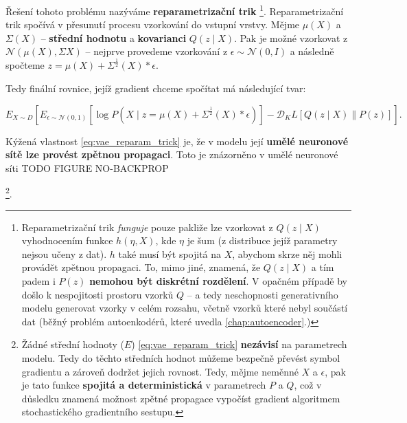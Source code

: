 Řešení tohoto problému nazýváme \textbf{reparametrizační trik}
\footnote{Reparametrizační trik \emph{funguje} pouze pakliže lze vzorkovat z $Q(z\mid X)$ vyhodnocením funkce $h(\eta, X)$, kde $\eta$ je šum (z distribuce jejíž parametry nejsou učeny z dat). $h$ také musí být spojitá na $X$, abychom skrze něj mohli provádět zpětnou propagaci.
To, mimo jiné, znamená, že $Q(z\mid X)$ a tím padem i $P(z)$ \textbf{nemohou být diskrétní rozdělení}. V opačném případě by došlo k nespojitosti prostoru vzorků $Q$ – a tedy neschopnosti generativního modelu generovat vzorky v celém rozsahu, včetně vzorků které nebyl součástí dat (běžný problém autoenkodérů, které uvedla \autoref{chap:autoencoder}.)}.
Reparametrizační trik spočívá v přesunutí procesu vzorkování do vstupní vrstvy.
Mějme $\mu(X)$ a $\Sigma(X)$ – \textbf{střední hodnotu} a \textbf{kovarianci} $Q(z\mid X)$.
Pak je možné vzorkovat z $\mathcal{N}(\mu(X), \Sigma{X})$ – nejprve provedeme vzorkování z $\epsilon \sim \mathcal{N}(0, I)$ a následně spočteme $z = \mu(X) + \Sigma^{\frac{1}{2}}(X) * \epsilon$.

Tedy finální rovnice, jejíž gradient chceme spočítat má následující tvar:

\begin{equation} \label{eq:vae_reparam_trick}
    E_{X \sim D} \left[ E_{\epsilon \sim \mathcal{N}(0, 1)} \left[ \log P(X\mid z = \mu(X) + \Sigma^{\frac{1}{2}} (X) * \epsilon) \right] - \mathcal{D}_KL \left[ Q (z \mid X) \parallel P(z) \right] \right].
\end{equation}

Kýžená vlastnost \autoref{eq:vae_reparam_trick} je, že v modelu její \textbf{umělé neuronové sítě lze provést zpětnou propagaci}. 
Toto je znázorněno v umělé neuronové síti TODO FIGURE NO-BACKPROP 

\footnote{Žádné střední hodnoty ($E$) \autoref{eq:vae_reparam_trick} \textbf{nezávisí} na parametrech modelu. Tedy do těchto středních hodnot můžeme bezpečně převést symbol gradientu a zároveň dodržet jejich rovnost. 
Tedy, mějme neměnné $X$ a $\epsilon$, pak je tato funkce \textbf{spojitá a deterministická} v parametrech $P$ a $Q$, což v důsledku znamená možnost zpětné propagace vypočíst gradient algoritmem stochastického gradientního sestupu. }. 